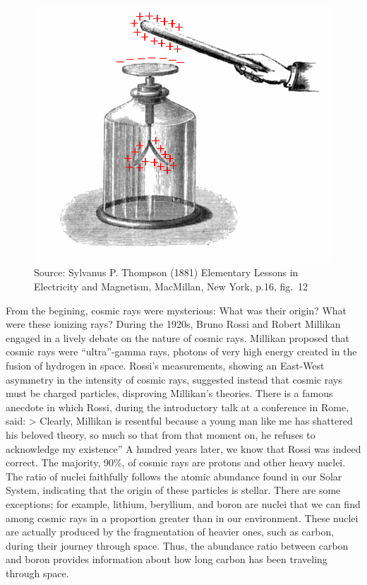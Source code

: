 \documentclass[
  letterpaper,
  DIV=11,
  numbers=noendperiod]{scrreprt}
\begin{document}
\begin{figure}[H]

{\centering \includegraphics{images/Electroscope_showing_induction.png}

}

\caption{Source: Sylvanus P. Thompson (1881) Elementary Lessons in
Electricity and Magnetism, MacMillan, New York, p.16, fig.~12}

\end{figure}%

From the begining, cosmic rays were mysterious: What was their origin?
What were these ionizing rays? During the 1920s, Bruno Rossi and Robert
Millikan engaged in a lively debate on the nature of cosmic rays.
Millikan proposed that cosmic rays were ``ultra''-gamma rays, photons of
very high energy created in the fusion of hydrogen in space. Rossi's
measurements, showing an East-West asymmetry in the intensity of cosmic
rays, suggested instead that cosmic rays must be charged particles,
disproving Millikan's theories. There is a famous anecdote in which
Rossi, during the introductory talk at a conference in Rome, said:
\textgreater{} Clearly, Millikan is resentful because a young man like
me has shattered his beloved theory, so much so that from that moment
on, he refuses to acknowledge my existence'' A hundred years later, we
know that Rossi was indeed correct. The majority, 90\%, of cosmic rays
are protons and other heavy nuclei. The ratio of nuclei faithfully
follows the atomic abundance found in our Solar System, indicating that
the origin of these particles is stellar. There are some exceptions; for
example, lithium, beryllium, and boron are nuclei that we can find among
cosmic rays in a proportion greater than in our environment. These
nuclei are actually produced by the fragmentation of heavier ones, such
as carbon, during their journey through space. Thus, the abundance ratio
between carbon and boron provides information about how long carbon has
been traveling through space.
\end{document}
